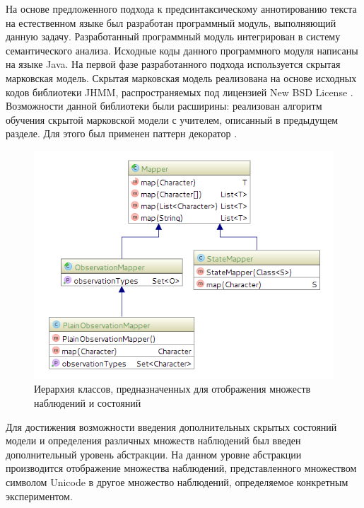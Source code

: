 На основе предложенного подхода к предсинтаксическому аннотированию текста на естественном языке был разработан программный модуль, выполняющий данную задачу. Разработанный программный модуль интегрирован в систему семантического анализа. Исходные коды данного программного модуля написаны на языке Java. На первой фазе разработанного подхода используется скрытая марковская модель. Скрытая марковская модель реализована на основе исходных кодов библиотеки JHMM, распространяемых под лицензией New BSD License \cite{nbsd}. Возможности данной библиотеки были расширины: реализован алгоритм обучения скрытой марковской модели с учителем, описанный в предыдущем разделе. Для этого был применен паттерн декоратор \cite{gof}.
\begin{figure}[H]
	\centering
	\includegraphics[scale=0.7]{img/uml_mappers.png}
	\caption{Иерархия классов, предназначенных для отображения множеств наблюдений и состояний}
\end{figure}
Для достижения возможности введения дополнительных скрытых состояний модели и определения различных множеств наблюдений был введен дополнительный уровень абстракции. На данном уровне абстракции производится отображение множества наблюдений, представленного множеством символом Unicode в другое множество наблюдений, определяемое конкретным экспериментом. 

